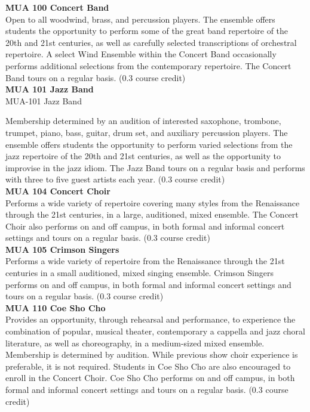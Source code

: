 \documentclass[
  letterpaper,
]{scrbook}
\begin{document}
\textbf{MUA 100 Concert Band}\\
Open to all woodwind, brass, and percussion players. The ensemble offers
students the opportunity to perform some of the great band repertoire of
the 20th and 21st centuries, as well as carefully selected
transcriptions of orchestral repertoire. A select Wind Ensemble within
the Concert Band occasionally performs additional selections from the
contemporary repertoire. The Concert Band tours on a regular basis. (0.3
course credit)\\
\textbf{MUA 101 Jazz Band}\\
MUA-101 Jazz Band

Membership determined by an audition of interested saxophone, trombone,
trumpet, piano, bass, guitar, drum set, and auxiliary percussion
players. The ensemble offers students the opportunity to perform varied
selections from the jazz repertoire of the 20th and 21st centuries, as
well as the opportunity to improvise in the jazz idiom. The Jazz Band
tours on a regular basis and performs with three to five guest artists
each year. (0.3 course credit)\\
\textbf{MUA 104 Concert Choir}\\
Performs a wide variety of repertoire covering many styles from the
Renaissance through the 21st centuries, in a large, auditioned, mixed
ensemble. The Concert Choir also performs on and off campus, in both
formal and informal concert settings and tours on a regular basis. (0.3
course credit)\\
\textbf{MUA 105 Crimson Singers}\\
Performs a wide variety of repertoire from the Renaissance through the
21st centuries in a small auditioned, mixed singing ensemble. Crimson
Singers performs on and off campus, in both formal and informal concert
settings and tours on a regular basis. (0.3 course credit)\\
\textbf{MUA 110 Coe Sho Cho}\\
Provides an opportunity, through rehearsal and performance, to
experience the combination of popular, musical theater, contemporary a
cappella and jazz choral literature, as well as choreography, in a
medium-sized mixed ensemble. Membership is determined by audition. While
previous show choir experience is preferable, it is not required.
Students in Coe Sho Cho are also encouraged to enroll in the Concert
Choir. Coe Sho Cho performs on and off campus, in both formal and
informal concert settings and tours on a regular basis. (0.3 course
credit)\\
\end{document}
